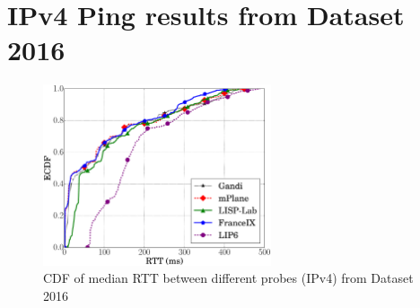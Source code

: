 \section{IPv4 Ping results from Dataset 2016}
\label{sec:pxtr_ping_v4_2016}


\begin{figure}[!t]
	\centering
	\includegraphics[width=0.6\textwidth]{Pics/v4/CDF_avg(RTT)_median_4_20.eps}
	\caption{CDF of median RTT between different probes (IPv4) from Dataset 2016}
	\label{CDF_of_median_RTT_between_different_probes_v4_2016}
\end{figure}

